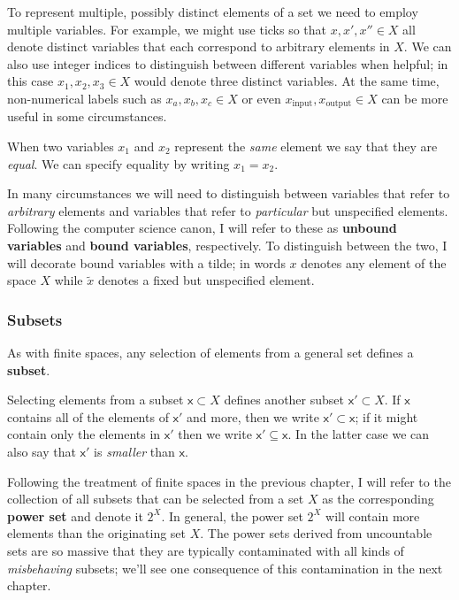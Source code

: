 \documentclass[
  letterpaper,
  DIV=11,
  numbers=noendperiod]{scrartcl}
\begin{document}
To represent multiple, possibly distinct elements of a set we need to
employ multiple variables. For example, we might use ticks so that
\(x, x', x'' \in X\) all denote distinct variables that each correspond
to arbitrary elements in \(X\). We can also use integer indices to
distinguish between different variables when helpful; in this case
\(x_{1}, x_{2}, x_{3} \in X\) would denote three distinct variables. At
the same time, non-numerical labels such as
\(x_{a}, x_{b}, x_{c} \in X\) or even
\(x_{\text{input}}, x_{\text{output}} \in X\) can be more useful in some
circumstances.

When two variables \(x_{1}\) and \(x_{2}\) represent the \emph{same}
element we say that they are \emph{equal}. We can specify equality by
writing \(x_{1} = x_{2}\).

In many circumstances we will need to distinguish between variables that
refer to \emph{arbitrary} elements and variables that refer to
\emph{particular} but unspecified elements. Following the computer
science canon, I will refer to these as \textbf{unbound variables} and
\textbf{bound variables}, respectively. To distinguish between the two,
I will decorate bound variables with a tilde; in words \(x\) denotes any
element of the space \(X\) while \(\tilde{x}\) denotes a fixed but
unspecified element.

\subsubsection{Subsets}\label{subsets}

As with finite spaces, any selection of elements from a general set
defines a \textbf{subset}.

Selecting elements from a subset \(\mathsf{x} \subset X\) defines
another subset \(\mathsf{x}' \subset X\). If \(\mathsf{x}\) contains all
of the elements of \(\mathsf{x}'\) and more, then we write
\(\mathsf{x}' \subset \mathsf{x}\); if it might contain only the
elements in \(\mathsf{x}'\) then we write
\(\mathsf{x}' \subseteq \mathsf{x}\). In the latter case we can also say
that \(\mathsf{x}'\) is \emph{smaller} than \(\mathsf{x}\).

Following the treatment of finite spaces in the previous chapter, I will
refer to the collection of all subsets that can be selected from a set
\(X\) as the corresponding \textbf{power set} and denote it \(2^X\). In
general, the power set \(2^X\) will contain more elements than the
originating set \(X\). The power sets derived from uncountable sets are
so massive that they are typically contaminated with all kinds of
\emph{misbehaving} subsets; we'll see one consequence of this
contamination in the next chapter.
\end{document}
